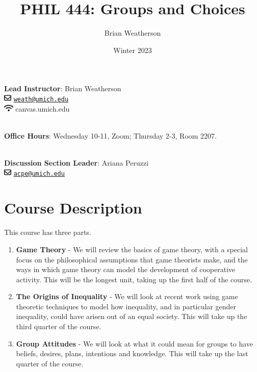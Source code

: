 \documentclass[
]{article}
\title{PHIL 444: Groups and Choices}
\author{Brian Weatherson}
\date{Winter 2023}
\providecommand{\tightlist}{%
  \setlength{\itemsep}{0pt}\setlength{\parskip}{0pt}}
\begin{document}
\maketitle

\textbf{Lead Instructor}: Brian Weatherson\\
\includegraphics[width=1em,height=1em]{figs/fa-icon-60569dd17e84ca89a2982f5f8ad92685.pdf}
\href{mailto:weath@umich.edu}{\nolinkurl{weath@umich.edu}}\\
\includegraphics[width=1.25em,height=1em]{figs/fa-icon-69b5e588a8cebb8cb21405167a7066e5.pdf}
canvas.umich.edu\\
\strut \\
\textbf{Office Hours}: Wednesday 10-11, Zoom; Thursday 2-3, Room 2207.\\
\strut \\
\textbf{Discussion Section Leader}: Ariana Peruzzi\\
\includegraphics[width=1em,height=1em]{figs/fa-icon-60569dd17e84ca89a2982f5f8ad92685.pdf}
\href{mailto:acpe@umich.edu}{\nolinkurl{acpe@umich.edu}}

\hypertarget{course-description}{%
\section{Course Description}\label{course-description}}

This course has three parts.

\begin{enumerate}
\def\labelenumi{\arabic{enumi}.}
\tightlist
\item
  \textbf{Game Theory} - We will review the basics of game theory, with
  a special focus on the philosophical assumptions that game theorists
  make, and the ways in which game theory can model the development of
  cooperative activity. This will be the longest unit, taking up the
  first half of the course.
\item
  \textbf{The Origins of Inequality} - We will look at recent work using
  game theoretic techniques to model how inequality, and in particular
  gender inequality, could have arisen out of an equal society. This
  will take up the third quarter of the course.
\item
  \textbf{Group Attitudes} - We will look at what it could mean for
  groups to have beliefs, desires, plans, intentions and knowledge. This
  will take up the last quarter of the course.
\end{enumerate}
\end{document}
